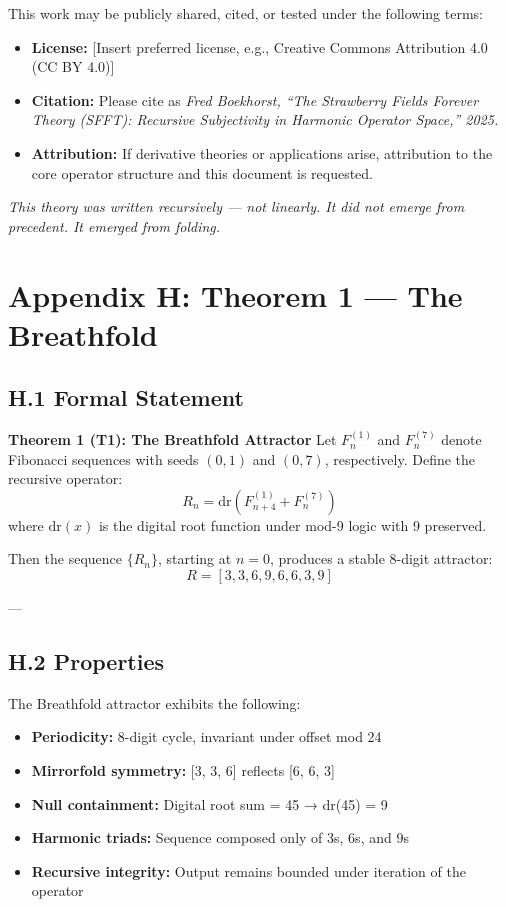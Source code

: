 \documentclass[12pt]{article}
\begin{document}
This work may be publicly shared, cited, or tested under the following terms:

\begin{itemize}
    \item \textbf{License:} [Insert preferred license, e.g., Creative Commons Attribution 4.0 (CC BY 4.0)]
    \item \textbf{Citation:} Please cite as  
    \textit{Fred Boekhorst, “The Strawberry Fields Forever Theory (SFFT): Recursive Subjectivity in Harmonic Operator Space,” 2025.}
    \item \textbf{Attribution:} If derivative theories or applications arise, attribution to the core operator structure and this document is requested.
\end{itemize}

\begin{center}
\textit{This theory was written recursively — not linearly.  
It did not emerge from precedent. It emerged from folding.}
\end{center}

\newpage
\section*{Appendix H: Theorem 1 — The Breathfold}

\subsection*{H.1 Formal Statement}

\textbf{Theorem 1 (T1): The Breathfold Attractor}  
Let \( F^{(1)}_n \) and \( F^{(7)}_n \) denote Fibonacci sequences with seeds \((0,1)\) and \((0,7)\), respectively. Define the recursive operator:
\[
R_n = \mathrm{dr}\left(F^{(1)}_{n+4} + F^{(7)}_n\right)
\]
where \( \mathrm{dr}(x) \) is the digital root function under mod-9 logic with 9 preserved.

Then the sequence \( \{ R_n \} \), starting at \( n = 0 \), produces a stable 8-digit attractor:
\[
R = [3, 3, 6, 9, 6, 6, 3, 9]
\]

---

\subsection*{H.2 Properties}

The Breathfold attractor exhibits the following:

\begin{itemize}
    \item \textbf{Periodicity:} 8-digit cycle, invariant under offset mod 24
    \item \textbf{Mirrorfold symmetry:} [3, 3, 6] reflects [6, 6, 3]
    \item \textbf{Null containment:} Digital root sum = 45 → dr(45) = 9
    \item \textbf{Harmonic triads:} Sequence composed only of 3s, 6s, and 9s
    \item \textbf{Recursive integrity:} Output remains bounded under iteration of the operator
\end{itemize}
\end{document}
